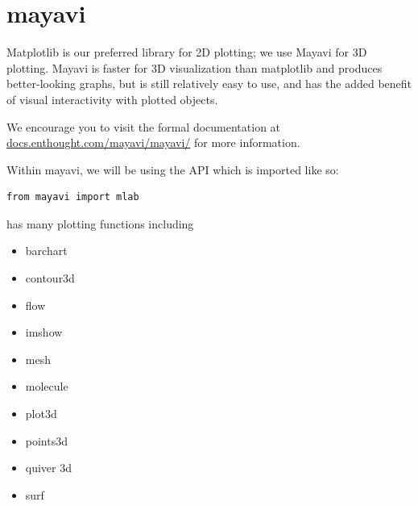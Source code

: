 \section*{mayavi}

Matplotlib is our preferred library for 2D plotting; we use Mayavi for 3D plotting. Mayavi is faster for 3D visualization than matplotlib and produces better-looking graphs, but is still relatively easy to use, and has the added benefit of visual interactivity with plotted objects.

We encourage you to visit the formal documentation at
\url{docs.enthought.com/mayavi/mayavi/} for more information. 

Within mayavi, we will be using the  API which is imported like so:
\begin{lstlisting}
from mayavi import mlab
\end{lstlisting}

 has many plotting functions including

\begin{itemize}
\item barchart
\item contour3d
\item flow
\item imshow
\item mesh
\item molecule
\item plot3d
\item points3d
\item quiver 3d
\item surf
\end{itemize}

